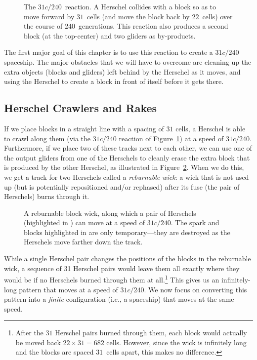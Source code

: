 \begin{figure}[!htb]
	\centering{}
	\caption{The $31c/240$~reaction. A Herschel collides with a block so as to move forward by $31$~cells (and move the block back by $22$~cells) over the course of $240$~generations. This reaction also produces a second block (at the top-center) and two gliders as by-products.}\label{fig:31c_240_reaction}
\end{figure}

The first major goal of this chapter is to use this reaction to create a $31c/240$ spaceship. The major obstacles that we will have to overcome are cleaning up the extra objects (blocks and gliders) left behind by the Herschel as it moves, and using the Herschel to create a block in front of itself before it gets there.


\subsection{Herschel Crawlers and Rakes}\label{sec:silverfish_herschel_crawler}

If we place blocks in a straight line with a spacing of $31$ cells, a Herschel is able to crawl along them (via the $31c/240$ reaction of Figure~\ref{fig:31c_240_reaction}) at a speed of $31c/240$. Furthermore, if we place two of these tracks next to each other, we can use one of the output gliders from one of the Herschels to cleanly erase the extra block that is produced by the other Herschel, as illustrated in Figure~\ref{fig:31c_240_herschel_pair}. When we do this, we get a track for two Herschels called a \emph{reburnable wick}: a wick that is not used up (but is potentially repositioned and/or rephased) after its fuse (the pair of Herschels) burns through it.

\begin{figure}[!htb]
	\centering
	\caption{A reburnable block wick, along which a pair of Herschels (highlighted in ) can move at a speed of $31c/240$. The spark and blocks highlighted in  are only temporary---they are destroyed as the Herschels move farther down the track.}\label{fig:31c_240_herschel_pair}
\end{figure}

While a single Herschel pair changes the positions of the blocks in the reburnable wick, a sequence of 31 Herschel pairs would leave them all exactly where they would be if no Herschels burned through them at all.\footnote{After the $31$ Herschel pairs burned through them, each block would actually be moved back $22 \times 31 = 682$ cells. However, since the wick is infinitely long and the blocks are spaced $31$~cells apart, this makes no difference.} This gives us an infinitely-long pattern that moves at a speed of $31c/240$. We now focus on converting this pattern into a \emph{finite} configuration (i.e., a spaceship) that moves at the same speed.

